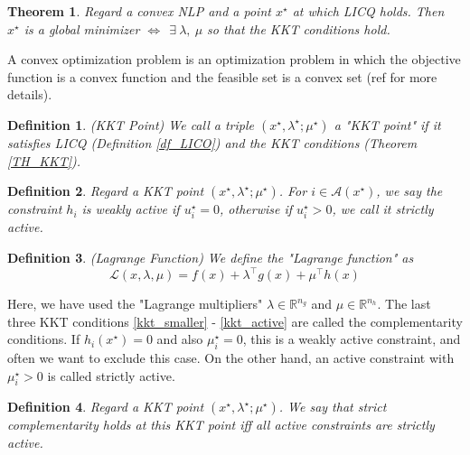\documentclass  [
  paper    = a4,
  BCOR     = 10mm,
  twoside,
  fontsize = 12pt,
  fleqn,
  toc      = bibnumbered,
  toc      = listofnumbered,
  numbers  = noendperiod,
  headings = normal,
  listof   = leveldown,
  version  = 3.03
]                                       {scrreprt}
\newcommand{\<}{\langle}
\renewcommand{\>}{\rangle}
\newtheorem{theorem}{Theorem}
\newtheorem{definition}{Definition}
\begin{document}
\begin{theorem} Regard a convex NLP and a point $x^\star$ at which LICQ holds. Then \\
	$x^\star$ is a global minimizer $\Longleftrightarrow \  \	\exists \ \lambda ,\  \mu $ so that the KKT conditions hold.
\end{theorem}

A convex optimization problem is an optimization problem in which the objective function is a convex function and the feasible set is a convex set (ref \cite{JorSte06} for more details). 
\begin{definition}(KKT Point)
	We call a triple $(x^\star, \lambda^\star; \mu^\star)$ a "KKT point" if it satisfies LICQ (Definition \ref{df_LICO}) and the KKT conditions (Theorem \ref{TH_KKT}).
\end{definition}


\begin{definition}
Regard a KKT point $(x^\star, \lambda^\star; \mu^\star)$. For $i \in \mathcal{A}(x^\star)$, we say the constraint $h_i$ is weakly active if $u_i^\star=0$, otherwise if  $u_i^\star>0$, we call it strictly active. 	
\end{definition}	

\begin{definition}(Lagrange Function)
	We define the "Lagrange function" as
	\begin{equation}
		\mathcal{L}(x,\lambda, \mu) = f(x) + \lambda^\top g(x) +  \mu^\top h(x) 
		\label{eq_Lagrangian}
	\end{equation}
\end{definition}
Here, we have used the "Lagrange multipliers" $\lambda \in \mathbb{R}^{n_g}$ and $\mu \in \mathbb{R}^{n_h}$. 
The last three KKT conditions \ref{kkt_smaller} - \ref{kkt_active} are called the complementarity conditions.  
If  $h_i(x^\star)=0$ and also $\mu_i^\star = 0$, this is a weakly active constraint, and often we want to exclude this case. On the other hand, an active constraint with $\mu_i^\star > 0$ is called strictly active.

\begin{definition}
	Regard a KKT point $(x^\star, \lambda^\star; \mu^\star)$. We say that strict complementarity holds at this KKT point iff all active constraints are strictly active.
\end{definition}
\end{document}
